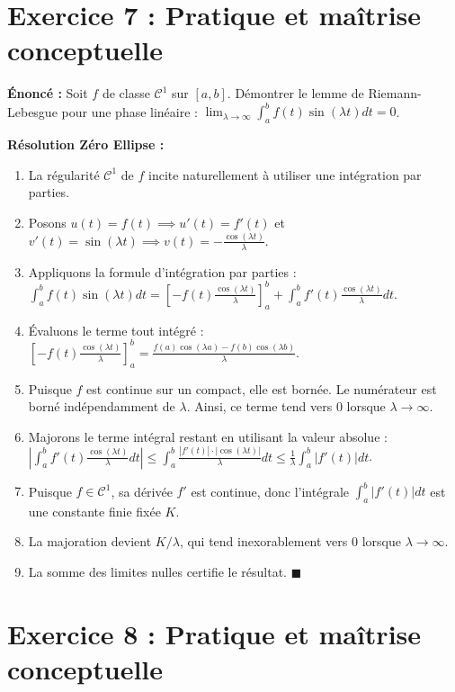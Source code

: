 \documentclass[11pt,a4paper]{article}
\begin{document}
\vspace{1em}

\section*{Exercice 7 : Pratique et maîtrise conceptuelle}

\textbf{Énoncé :}
Soit $f$ de classe $\mathcal{C}^1$ sur $[a,b]$. Démontrer le lemme de Riemann-Lebesgue pour une phase linéaire : $\lim_{\lambda \to \infty} \int_a^b f(t) \sin(\lambda t) dt = 0$.

\textbf{Résolution Zéro Ellipse :}
\begin{enumerate}
\item La régularité $\mathcal{C}^1$ de $f$ incite naturellement à utiliser une intégration par parties.
\item Posons $u(t) = f(t) \implies u'(t) = f'(t)$ et $v'(t) = \sin(\lambda t) \implies v(t) = -\frac{\cos(\lambda t)}{\lambda}$.
\item Appliquons la formule d'intégration par parties :
   $\int_a^b f(t) \sin(\lambda t) dt = \left[ -f(t) \frac{\cos(\lambda t)}{\lambda} \right]_a^b + \int_a^b f'(t) \frac{\cos(\lambda t)}{\lambda} dt$.
\item Évaluons le terme tout intégré :
   $\left[ -f(t) \frac{\cos(\lambda t)}{\lambda} \right]_a^b = \frac{f(a)\cos(\lambda a) - f(b)\cos(\lambda b)}{\lambda}$.
\item Puisque $f$ est continue sur un compact, elle est bornée. Le numérateur est borné indépendamment de $\lambda$. Ainsi, ce terme tend vers $0$ lorsque $\lambda \to \infty$.
\item Majorons le terme intégral restant en utilisant la valeur absolue :
   $| \int_a^b f'(t) \frac{\cos(\lambda t)}{\lambda} dt | \leq \int_a^b \frac{|f'(t)| \cdot |\cos(\lambda t)|}{\lambda} dt \leq \frac{1}{\lambda} \int_a^b |f'(t)| dt$.
\item Puisque $f \in \mathcal{C}^1$, sa dérivée $f'$ est continue, donc l'intégrale $\int_a^b |f'(t)| dt$ est une constante finie fixée $K$.
\item La majoration devient $K / \lambda$, qui tend inexorablement vers $0$ lorsque $\lambda \to \infty$.
\item La somme des limites nulles certifie le résultat. $\blacksquare$
\end{enumerate}


\vspace{1em}

\section*{Exercice 8 : Pratique et maîtrise conceptuelle}
\end{document}
